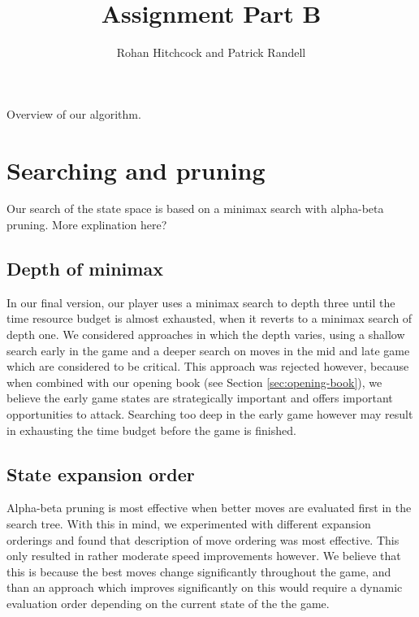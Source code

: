 \documentclass[11pt]{article}
\newcommand{\drafting}[1]{\textcolor{OliveGreen}{#1}}
\begin{document}
\title{\textbf{Assignment Part B}}
\author{Rohan Hitchcock and Patrick Randell}
\date{}
\maketitle

\drafting{
    Overview of our algorithm.
}

\section{Searching and pruning}
Our search of the state space is based on a minimax search with alpha-beta pruning. \drafting{More explination here?}

\subsection{Depth of minimax}
In our final version, our player uses a minimax search to depth three until the time resource budget is almost exhausted, when it reverts to a minimax search of depth one. We considered approaches in which the depth varies, using a shallow search early in the game and a deeper search on moves in the mid and late game which are considered to be critical. This approach was rejected however, because when combined with our opening book (see Section \ref{sec:opening-book}), we believe the early game states are strategically important and offers important opportunities to attack. Searching too deep in the early game however may result in exhausting the time budget before the game is finished. 

\subsection{State expansion order}
Alpha-beta pruning is most effective when better moves are evaluated first in the search tree. With this in mind, we experimented with different expansion orderings and found that \drafting{description of move ordering} was most effective. This only resulted in rather moderate speed improvements however. We believe that this is because the best moves change significantly throughout the game, and than an approach which improves significantly on this would require a dynamic evaluation order depending on the current state of the the game. 
\end{document}
